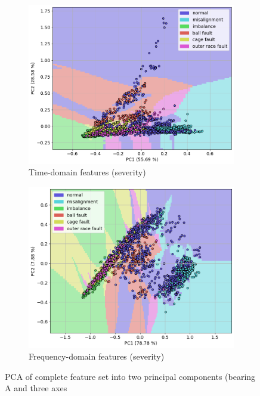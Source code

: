 \begin{figure}[h]
\begin{subfigure}[b]{0.48\textwidth}
        \includegraphics[width=\textwidth]{assets/results/labels/PCA-TD-severity.png}
        \caption{Time-domain features (severity)}
    \end{subfigure}
    \hfill
    \begin{subfigure}[b]{0.48\textwidth}
        \includegraphics[width=\textwidth]{assets/results/labels/PCA-FD-severity.png}
        \caption{Frequency-domain features (severity)}
    \end{subfigure} 
    \caption{PCA of complete feature set into two principal components (bearing A and three axes}
    \label{fig:design:pca-complete-sets}
\end{figure}

